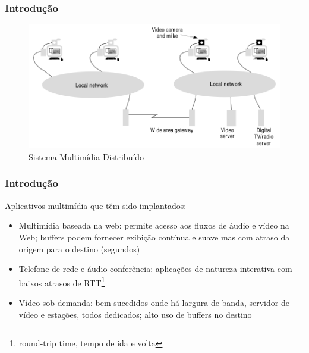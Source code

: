 \documentclass[]{beamer}
\begin{document}
\begin{frame}
  \frametitle{Introdução}
   \begin{figure}[hbtp]
  \caption{Sistema Multimídia Distribuído}
  \begin{center}
   \includegraphics[scale=0.28]{sistema_multimidia_distribuido.png}
  \end{center}
 \end{figure}
\end{frame}


\begin{frame}
  \frametitle{Introdução}
Aplicativos multimídia que têm sido implantados:
\begin{itemize}
  \item Multimídia baseada na web: permite acesso aos fluxos de áudio e vídeo na Web; buffers
podem fornecer exibição contínua e suave mas com atraso da origem para o destino (segundos)
  \item Telefone de rede e áudio-conferência: aplicações de natureza interativa com baixos
atrasos de RTT\footnote{round-trip time, tempo de ida e volta}
  \item Vídeo sob demanda: bem sucedidos onde há largura de banda, servidor de vídeo e 
estações, todos dedicados;
alto uso de buffers no destino
\end{itemize}
\end{frame}
\end{document}
